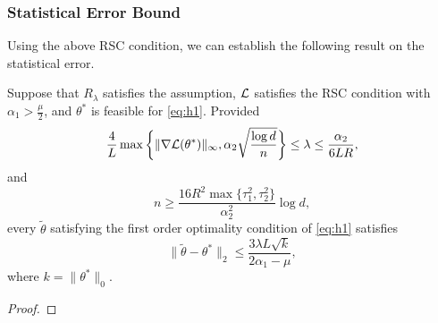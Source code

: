 \subsubsection{Statistical Error Bound}

Using the above RSC condition,
we can establish the following result on the statistical error.
\begin{thm}
Suppose that $R_\lambda$ satisfies the assumption,
$\mathcal{L}$ satisfies the RSC condition with $\alpha_1>\frac{\mu}{2}$,
and $\theta^*$ is feasible for \eqref{eq:h1}.
Provided
\begin{equation}
    \frac{4}{L}\max\bigg\{\|\nabla\mathcal{L}(\theta^*)\|_\infty,
        \alpha_2\sqrt{\frac{\log d}{n}}\bigg\}\le\lambda\le\frac{\alpha_2}{{6LR}},
\end{equation}
and
\begin{equation}
    n\ge\frac{16R^2\max\{\tau_1^2,\tau_2^2\}}{\alpha_2^2}\log d,
\end{equation}
every $\tilde\theta$ satisfying the first order optimality condition of
\eqref{eq:h1} satisfies
\begin{equation}
    \|\tilde\theta-\theta^*\|_2\le\frac{3\lambda L\sqrt{k}}{2\alpha_1-\mu},
\end{equation}
where $k=\|\theta^*\|_0$.
\end{thm}
\begin{proof}
\todo
\end{proof}
